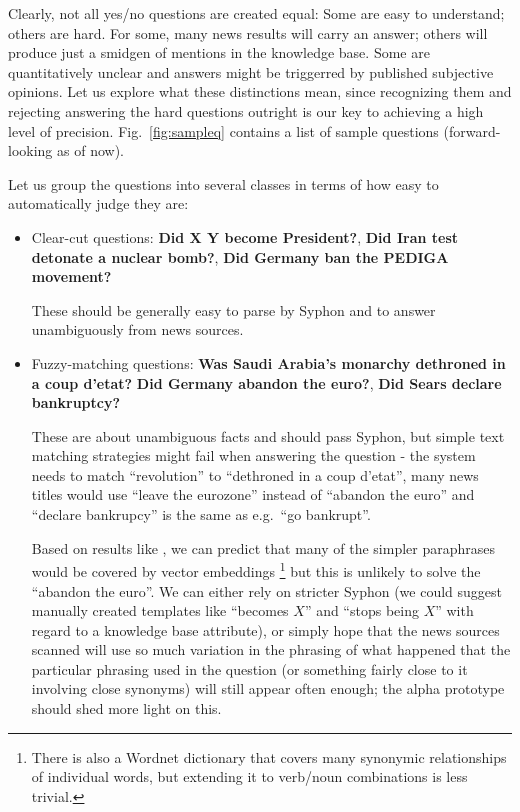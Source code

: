 \documentclass[11pt,a4paper]{article}
\begin{document}
Clearly, not all yes/no questions are created equal:
Some are easy to understand; others are hard.
For some, many news results will carry an answer; others will produce just a smidgen of mentions in the knowledge base.
Some are quantitatively unclear and answers might be triggerred by published subjective opinions.
Let us explore what these distinctions mean,
since recognizing them and rejecting answering
the hard questions outright is our key to achieving a high level of precision.
Fig.~\ref{fig:sampleq} contains a list of sample questions (forward-looking as of now).

Let us group the questions into several classes in terms of how easy to automatically judge they are:

\begin{itemize}
	\item Clear-cut questions: \textbf{Did X Y become President?},
		\textbf{Did Iran test detonate a nuclear bomb?},
		\textbf{Did Germany ban the PEDIGA movement?}

		These should be generally easy to parse by Syphon
		and to answer unambiguously from news sources.

	\item Fuzzy-matching questions: \textbf{Was Saudi Arabia’s monarchy dethroned in a coup d’etat?}
		\textbf{Did Germany abandon the euro?},
		\textbf{Did Sears declare bankruptcy?}

		These are about unambiguous facts and should pass Syphon,
		but simple text matching strategies might fail when
		answering the question - the system needs to match
		``revolution'' to ``dethroned in a coup d'etat'',
		many news titles would use ``leave the eurozone''
		instead of ``abandon the euro'' and ``declare bankrupcy''
		is the same as e.g.\ ``go bankrupt''.

		Based on results like \citep{DefGen,QANTA},
		we can predict that many of the simpler paraphrases
		would be covered by vector embeddings%
\footnote{There is also a Wordnet dictionary that covers many synonymic relationships of individual words, but extending it to verb/noun combinations is less trivial.}
		but this is unlikely to solve the ``abandon the euro''.
		We can either rely on stricter Syphon
		(we could suggest manually created templates like
		``becomes $X$'' and ``stops being $X$''
		with regard to a knowledge base attribute),
		or simply hope that the news sources scanned will use so
		much variation in the phrasing of what happened that the particular phrasing used in the question
		(or something fairly close to it involving close synonyms)
		will still appear often enough; the alpha prototype
		should shed more light on this.


\end{itemize}
\end{document}
